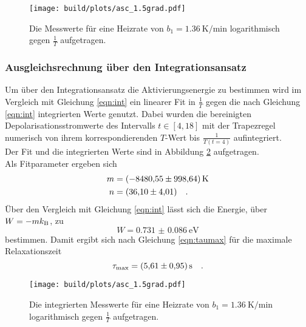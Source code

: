 \begin{figure}[ht]
  \centering
  \texttt{[image: build/plots/asc\_1.5grad.pdf]}
  \caption{Die Messwerte für eine Heizrate von $b_1 = \SI{1.36}{\kelvin\per\minute}$ 
          logarithmisch gegen $\frac{1}{T}$ aufgetragen.}
  \label{img:pol15}
\end{figure}



\subsubsection{Ausgleichsrechnung über den Integrationsansatz}
\label{sec:int}

\noindent 
Um über den Integrationsansatz die Aktivierungsenergie zu bestimmen wird im Vergleich mit Gleichung \ref{eqn:int} ein linearer Fit in 
$\frac{1}{T}$ gegen die nach Gleichung \ref{eqn:int} integrierten Werte genutzt. Dabei wurden die bereinigten Depolarisationsstromwerte
des Intervalls $t \in [4,18]$  mit der Trapezregel numerisch von ihrem korrespondierenden $T$-Wert bis $\frac{1}{T(t = 4)}$ aufintegriert.\\
Der Fit und die integrierten Werte sind in Abbildung \ref{img:int15} aufgetragen.\\
Als Fitparameter ergeben sich 
\begin{align*}
  m & = \SI{ -8480.55(99864)}{\kelvin}\\
  n & = \SI{36.10 (401)}{} \quad .
\end{align*}
Über den Vergleich mit Gleichung \ref{eqn:int} lässt sich die Energie, über $W = -m k_\t{B}$, zu 
\begin{equation*}
  W = \SI{0.731(0086)}{\electronvolt}
\end{equation*}
bestimmen. Damit ergibt sich nach Gleichung \ref{eqn:taumax} für die maximale Relaxationszeit 
\begin{equation*}
  \tau_\t{max} = \SI{5.61 (095)}{\second} \quad .
\end{equation*}

\begin{figure}[ht]
  \centering
  \texttt{[image: build/plots/asc\_1.5grad.pdf]}
  \caption{Die integrierten Messwerte für eine Heizrate von $b_1 = \SI{1.36}{\kelvin\per\minute}$ 
          logarithmisch gegen $\frac{1}{T}$ aufgetragen.}
  \label{img:int15}
\end{figure}

